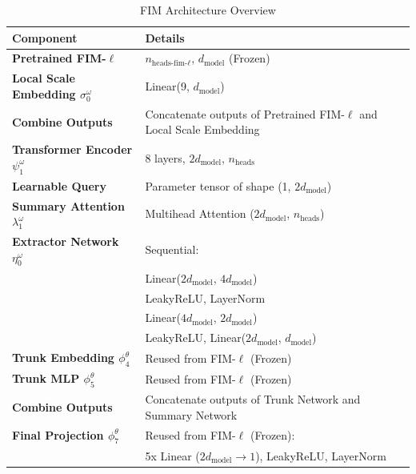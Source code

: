\documentclass{article}
\theoremstyle{plain}
\theoremstyle{definition}
\theoremstyle{remark}
\begin{document}
\begin{table}[h!]
    \centering
    \label{tab:architecture_megatron}
    \renewcommand{\arraystretch}{1.2} %
    \begin{tabular}{p{} p{}}
    \toprule
    \textbf{Component}               & \textbf{Details} \\ \midrule
    \textbf{Pretrained FIM-$\ell$}   & $n_\text{heads-fim-$\ell$}$, $d_\text{model}$ (Frozen) \\ \midrule
    \textbf{Local Scale Embedding $\sigma^{\omega}_0$}   & Linear(9, $d_\text{model}$) \\ \midrule
    
    \textbf{Combine Outputs}         & Concatenate outputs of Pretrained FIM-$\ell$ and Local Scale Embedding \\ \midrule
    \textbf{Transformer Encoder $\psi^{\omega}_1$}     & 8 layers, $2d_\text{model}$, $n_\text{heads}$ \\ \midrule
    
    
    \textbf{Learnable Query}         & Parameter tensor of shape (1, $2d_\text{model}$)\\ \midrule
    \textbf{Summary Attention  $\lambda^{\omega}_1$}       & Multihead Attention ($2d_\text{model}$, $n_\text{heads}$) \\ \midrule
    
    \textbf{Extractor Network $\eta^{\omega}_0$} & Sequential: \\ 
    & \quad Linear($2d_\text{model}$, $4d_\text{model}$) \\ 
    & \quad LeakyReLU, LayerNorm \\ 
    & \quad Linear($4d_\text{model}$, $2d_\text{model}$) \\ 
    & \quad LeakyReLU, Linear($2d_\text{model}$, $d_\text{model}$) \\ \midrule
    
    \textbf{Trunk Embedding $\phi^{\theta}_4$}         & Reused from FIM-$\ell$ (Frozen)\\ \midrule
    \textbf{Trunk MLP $\phi^{\theta}_5$}           & Reused from FIM-$\ell$ (Frozen) \\ \midrule
    \textbf{Combine Outputs}         & Concatenate outputs of Trunk Network and Summary Network \\ \midrule
    \textbf{Final Projection $\phi^{\theta}_7$}        & Reused from FIM-$\ell$ (Frozen): \\ 
                                      & \quad 5x Linear ($2d_\text{model} \to 1$), LeakyReLU, LayerNorm \\ 
    \bottomrule
    \end{tabular}
    \caption{FIM Architecture Overview}

    \end{table}
    
\end{document}
